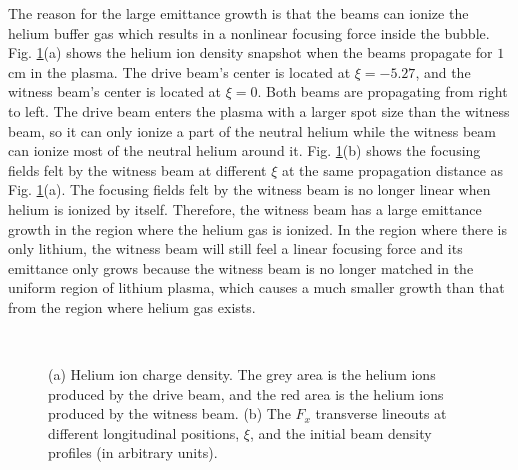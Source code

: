 \documentclass[%
reprint, superscriptaddress,
 amsmath,amssymb, aps,
prstab,
]{revtex4-2}
\begin{document}
The reason for the large emittance growth is that
        the beams can ionize the helium buffer gas which results in a
        nonlinear focusing force inside the bubble.
        Fig. \ref{fig:HICD_and_focus_x}(a)  shows the helium ion density
        snapshot when the beams propagate for $1$ cm in the plasma. The
        drive beam's center is located at  $\xi = -5.27$, and the
        witness beam's center is located at $\xi = 0$. Both beams are propagating from right to left. The drive beam
        enters the plasma with a larger spot size than the witness beam,
        so it can only ionize a part of the neutral helium while the
        witness beam can ionize most of the neutral helium around it.
        Fig. \ref{fig:HICD_and_focus_x}(b) shows the focusing fields felt
        by the witness beam at different $\xi$ at the same propagation
        distance as Fig. \ref{fig:HICD_and_focus_x}(a). The focusing
        fields felt by the witness beam is no longer linear when
        helium is ionized by itself. Therefore, the witness beam has a
        large emittance growth in the region where the helium gas is
        ionized. In the region where there is only lithium, the witness
        beam will still feel a linear focusing force and its emittance
        only grows because the witness beam is no longer matched in the
        uniform region of lithium plasma, which causes a much smaller growth than that from the region where helium gas exists.
        \begin{figure}[htbp] 
    \\
    \caption{(a) Helium ion charge density. The grey area is the
    helium ions produced by the drive beam, and the red area is the
    helium ions produced by the witness beam. (b) The $F_x$ transverse
    lineouts at different longitudinal positions, $\xi$, and the initial
    beam density profiles (in arbitrary units).} \label{fig:HICD_and_focus_x} \end{figure}
\end{document}
